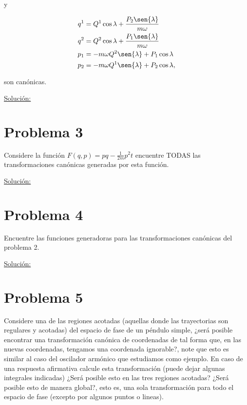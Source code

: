 \documentclass[a4paper,10pt]{article}
\numberwithin{equation}{section}
\begin{document}
y

\begin{align*}
 q^1 &= Q^1\cos{\lambda} + \frac{P_2\sen{\lambda}}{m\omega} \\
 q^2 &= Q^2\cos{\lambda} + \frac{P_1\sen{\lambda}}{m\omega}\\
 p_1 &= - m\omega Q^2\sen{\lambda} + P_1 \cos{\lambda}\\
 p_2 &= - m\omega Q^1\sen{\lambda} + P_2 \cos{\lambda},
\end{align*}

son canónicas.

\vspace{.3cm}

\underline{Solución:} \vspace{.3cm}

\section{Problema 3}

Considere la función $F(q,p) = pq - \frac{1}{2m}p^2 t$ encuentre TODAS las transformaciones 
canónicas generadas por esta función.

\vspace{.3cm}

\underline{Solución:} \vspace{.3cm}

\section{Problema 4}

Encuentre las funciones generadoras para las transformaciones canónicas del problema 
2.

\vspace{.3cm}

\underline{Solución:} \vspace{.3cm}

\section{Problema 5}

Considere una de las regiones acotadas (aquellas donde las trayectorias son regulares 
y acotadas) del espacio de fase de un péndulo simple, ¿será posible encontrar una 
transformación canónica de coordenadas de tal forma que, en las nuevas coordenadas, 
tengamos una coordenada ignorable?, note que esto es similar al caso del oscilador 
armónico que estudiamos como ejemplo. En caso de una respuesta afirmativa calcule 
esta transformación (puede dejar algunas integrales indicadas) ¿Será posible 
esto en las tres regiones acotadas? ¿Será posible esto de manera global?, esto es,
una sola transformación para todo el espacio de fase (excepto por algunos puntos o 
lineas).
\end{document}
